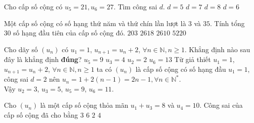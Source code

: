 \begin{ex}%
	Cho cấp số cộng có $u_5 =21, u_6 =27$. Tìm công sai $d$.
	\choice
	{$d=5$}
	{$d=7$}
	{$d=8$}
	{\True $d=6$}
\end{ex}%
\begin{ex}%
	Một cấp số cộng có số hạng thứ năm và thứ chín lần lượt là $3$ và $35$. Tính tổng $30$ số hạng đầu tiên của cấp số cộng đó.
	\choice
	{$203$}
	{$2618$}
	{\True $2610$}
	{$5220$}
\end{ex}%
\begin{ex}%
	Cho dãy số $(u_n)$ có $u_1=1$, $u_{n+1}=u_n+2$, $\forall n\in\mathbb{N}, n\geq 1$. Khẳng định nào sau đây là khẳng định \textbf{đúng}?
	\choice
	{\True $u_5=9$}
	{$u_3=4$}
	{$u_2=2$}
	{$u_6=13$}
	\loigiai
	{Từ giả thiết $u_1=1$, $u_{n+1}=u_n+2$, $\forall n\in\mathbb{N}, n\geq 1$ ta có $(u_n)$ là cấp số cộng có số hạng đầu $u_1=1$, công sai $d=2$ nên $u_n=1+2(n-1)=2n-1, \forall n\in\mathbb{N^*}$.\\
	Vậy $u_2=3$, $u_3=5$, $u_5=9$, $u_6=11$.}
\end{ex}%
\begin{ex}%
	Cho $\left(u_{n}\right)$ là một cấp số cộng thỏa mãn $u_{1}+u_{3}=8$ và $u_{4}=10$. Công sai của cấp số cộng đã cho bằng
	\choice
	{\True $3$}
	{$6$}
	{$2$}
	{$4$}
\end{ex}%
